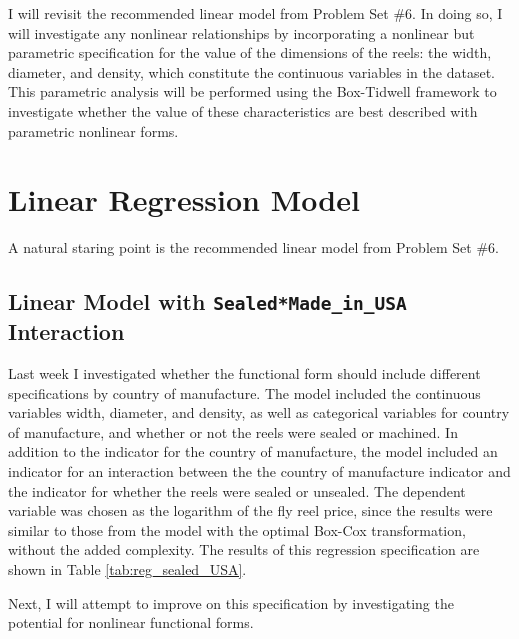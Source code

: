 \documentclass[11pt]{paper}
\begin{document}
I will revisit the recommended linear model
from Problem Set \#6. 
%
%
%
In doing so, I will investigate any nonlinear relationships
by incorporating a nonlinear but parametric specification
for the value of the dimensions of the reels:
the width, diameter, and density, 
which constitute the continuous variables in the dataset.
This parametric analysis will be performed
using the Box-Tidwell framework
to investigate whether the value of these characteristics
are best described with parametric nonlinear forms. 


\clearpage
\section{Linear Regression Model}

A natural staring point is the recommended linear model
from Problem Set \#6. 

\subsection{Linear Model with \texttt{Sealed*Made\_in\_USA} Interaction}

Last week I investigated whether 
the functional form should include different specifications by
country of manufacture.
% 
The model included the continuous variables 
width, diameter, and density, 
as well as categorical variables for 
country of manufacture, 
and whether or not the reels were sealed or machined. 
% 
In addition to the indicator for the country of manufacture, the model included an indicator for an interaction between
the the country of manufacture indicator and the indicator for whether the reels were sealed or unsealed. 
% 
The dependent variable was chosen as 
the logarithm of the fly reel price, 
since the results were similar to those from the model 
with the optimal Box-Cox transformation, 
without the added complexity. 
% 
The results of this regression specification are shown in 
Table \ref{tab:reg_sealed_USA}. 
% 

% 
Next, I will attempt to improve on this specification
by investigating the potential for nonlinear functional forms. %







\clearpage
\end{document}
